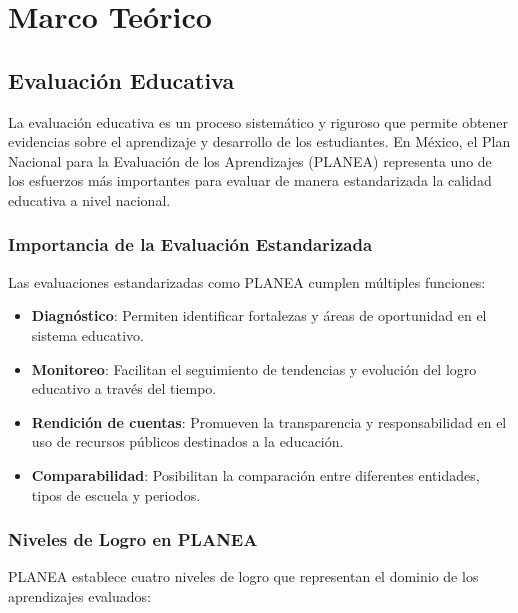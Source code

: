 \chapter{Marco Teórico}

\section{Evaluación Educativa}
La evaluación educativa es un proceso sistemático y riguroso que permite obtener evidencias sobre el aprendizaje y desarrollo de los estudiantes. En México, el Plan Nacional para la Evaluación de los Aprendizajes (PLANEA) representa uno de los esfuerzos más importantes para evaluar de manera estandarizada la calidad educativa a nivel nacional.

\subsection{Importancia de la Evaluación Estandarizada}
Las evaluaciones estandarizadas como PLANEA cumplen múltiples funciones:

\begin{itemize}
    \item \textbf{Diagnóstico}: Permiten identificar fortalezas y áreas de oportunidad en el sistema educativo.
    \item \textbf{Monitoreo}: Facilitan el seguimiento de tendencias y evolución del logro educativo a través del tiempo.
    \item \textbf{Rendición de cuentas}: Promueven la transparencia y responsabilidad en el uso de recursos públicos destinados a la educación.
    \item \textbf{Comparabilidad}: Posibilitan la comparación entre diferentes entidades, tipos de escuela y periodos.
\end{itemize}

\subsection{Niveles de Logro en PLANEA}
PLANEA establece cuatro niveles de logro que representan el dominio de los aprendizajes evaluados:

